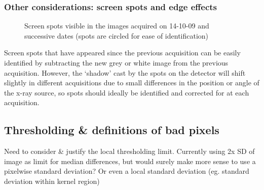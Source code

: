 \documentclass[\main/IO-Pixels.tex]{subfiles}
\begin{document}
\subsubsection{Other considerations: screen spots and edge effects}
\begin{figure}[!ht]
\caption{Screen spots visible in the images acquired on 14-10-09 and successive dates (spots are circled for ease of identification)}
\centering

%
%

\end{figure}


Screen spots that have appeared since the previous acquisition can be easily identified by subtracting the new grey or white image from the previous acquisition. However, the `shadow' cast by the spots on the detector will shift slightly in different acquisitions due to small differences in the position or angle of the x-ray source, so spots should ideally be identified and corrected for at each acquisition.

\subsection{Thresholding \& definitions of bad pixels}

Need to consider \& justify the local thresholding limit. Currently using 2x SD of image as limit for median differences, but would surely make more sense to use a pixelwise standard deviation? Or even a local standard deviation (eg. standard deviation within kernel region)

\end{document}
